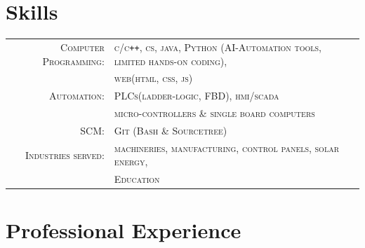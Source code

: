 \documentclass[a4paper]{article}
\newcommand{\SectionSize}{\Large}
\begin{document}
\vspace{-1em} %
\section{\LARGE{\textbf{Skills}}}
\begin{tabular}{rl}	\small{}
	\small{}\textsc{		Computer Programming:	}	& \textsc{	\small{c/c\texttt{++}}, cs, java, Python (AI-Automation tools, limited hands-on coding),			}	\\
														& \textsc{	web(html, css, js)								} 	\\
	\small{}\textsc{		Automation:				}	& \textsc{	PLCs(ladder-logic, FBD), hmi/scada				}	\\
														& \textsc{	micro-controllers \& single board computers		} 	\\
	\small{}\textsc{		SCM:					}	& \textsc{	Git (Bash \& Sourcetree)						}	\\
	\small{}\textsc{		Industries served:		}	& \textsc{	machineries, manufacturing, control panels, solar energy,				}	\\
														& \textsc{	Education													} 	\\
\end{tabular}

\vspace{0em} %
\section{\SectionSize\textbf{Professional Experience}}
\end{document}
